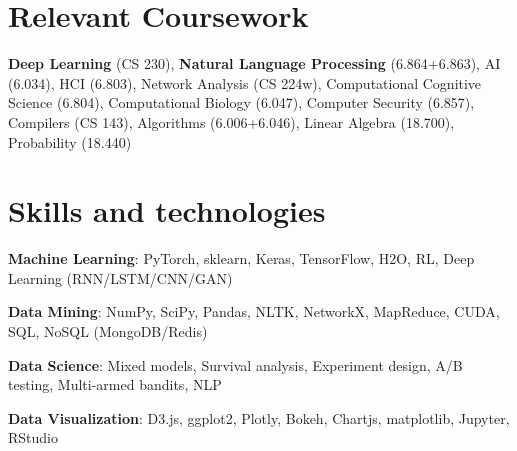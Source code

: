 \documentclass[margin,line]{resume}
\begin{document}
\begin{resume}
\vspace{-4mm}

\section{\mysidestyle Relevant Coursework}

\textbf{Deep Learning} (CS 230), \textbf{Natural Language Processing} (6.864+6.863), AI (6.034), HCI (6.803), Network Analysis (CS 224w), Computational Cognitive Science (6.804), Computational Biology (6.047), Computer Security (6.857), Compilers (CS 143), Algorithms (6.006+6.046), Linear Algebra (18.700), Probability (18.440)

\section{\mysidestyle Skills and technologies}

\textbf{Machine Learning}: PyTorch, sklearn, Keras, TensorFlow, H2O, RL, Deep Learning (RNN/LSTM/CNN/GAN) %

\vspace{-4mm}


\textbf{Data Mining}: NumPy, SciPy, Pandas, NLTK, NetworkX, MapReduce, CUDA, SQL, NoSQL (MongoDB/Redis)

\vspace{-4mm}

\textbf{Data Science}: Mixed models, Survival analysis, Experiment design, A/B testing, Multi-armed bandits, NLP

\vspace{-4mm}

\textbf{Data Visualization}: D3.js, ggplot2, Plotly, Bokeh, Chartjs, matplotlib, Jupyter, RStudio



\vspace{-4mm}



\end{resume}
\end{document}
